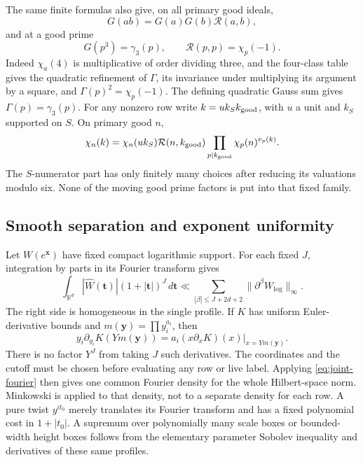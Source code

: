 \documentclass[12pt]{article}
\begin{document}
The same finite formulas also give, on all primary good ideals,
\begin{equation}\label{eq:G-quadratic-refinement}
 G(ab)=G(a)G(b)\mathcal R(a,b),
\end{equation}
and at a good prime
\begin{equation}\label{eq:fixed-gauss-phases}
 G(p^3)=\gamma_3(p),\qquad \mathcal R(p,p)=\chi_p(-1).
\end{equation}
Indeed \(\chi_a(4)\) is multiplicative of order dividing three,
and the four-class table gives the quadratic refinement of
\(\Gamma\), its invariance under multiplying its argument by a
square, and \(\Gamma(p)^2=\chi_p(-1)\).  The defining quadratic
Gauss sum gives \(\Gamma(p)=\gamma_3(p)\).
For any nonzero row write \(k=u k_S k_{\rm good}\), with
\(u\) a unit and \(k_S\) supported on \(S\).  On primary good \(n\),
\begin{equation}\label{own:row-fixed-ray}
 \chi_n(k)=\chi_n(uk_S)\mathcal R(n,k_{\rm good})
                 \prod_{p\mid k_{\rm good}}\chi_p(n)^{v_p(k)}.
\end{equation}
The \(S\)-numerator part has only finitely many choices after
reducing its valuations modulo six.  None of the moving good
prime factors is put into that fixed family.

\subsection{Smooth separation and exponent uniformity}\label{app:smooth}

Let \(W(e^{\mathbf x})\) have fixed compact logarithmic support.
For each fixed \(J\), integration by parts in its Fourier transform gives
\[
 \int_{\mathbb R^d}|\widehat W(\mathbf t)|
               (1+|\mathbf t|)^J\,d\mathbf t
 \ll \sum_{|\beta|\le J+2d+2}\|\partial^\beta W_{\log}\|_\infty .
 \tag{A3}\label{eq:joint-fourier}
\]
The right side is homogeneous in the single profile.
If \(K\) has uniform Euler-derivative bounds and
\(m(\mathbf y)=\prod y_i^{a_i}\), then
\[
 y_i\partial_{y_i}K(Ym(\mathbf y))
     =a_i(x\partial_xK)(x)\big|_{x=Ym(\mathbf y)} .
\]
There is no factor \(Y^J\) from taking \(J\) such derivatives.
The coordinates and the cutoff must be chosen before evaluating
any row or live label.  Applying \eqref{eq:joint-fourier} then gives
one common Fourier density for the whole Hilbert-space norm.
Minkowski is applied to that density, not to a separate density for
each row.  A pure twist \(y^{it_0}\) merely translates its Fourier
transform and has a fixed polynomial cost in \(1+|t_0|\).
A supremum over polynomially many scale boxes or bounded-width
height boxes follows from the elementary parameter Sobolev inequality
and derivatives of these same profiles.
\end{document}
